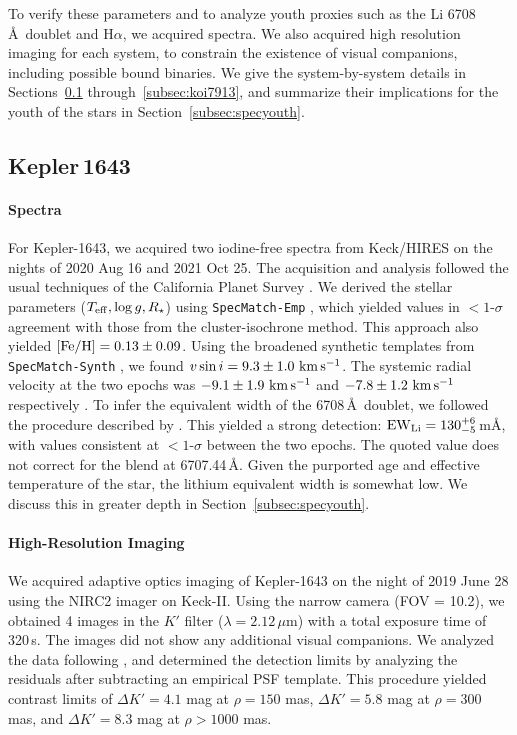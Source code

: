 \documentclass[12pt,twocolumn,tighten,linenumbers,trackchanges]{aastex63}
\newcommand{\mkms}{{\rm \,km\,s^{-1}}}  %
\begin{document}
To verify these parameters and to analyze youth
proxies such as the Li 6708\,\AA\ doublet and H$\alpha$, we acquired
spectra.  We also acquired high resolution imaging for each system, to
constrain the existence of visual companions, including possible bound
binaries.  We give the system-by-system details in Sections~\ref{subsec:kep1643}
through~\ref{subsec:koi7913}, and summarize their implications for
the youth of the stars in Section~\ref{subsec:specyouth}.

\subsection{Kepler\,1643}
\label{subsec:kep1643}

\paragraph{Spectra}
For Kepler-1643, we acquired two iodine-free spectra from Keck/HIRES
on the nights of 2020 Aug 16 and 2021 Oct 25.  The acquisition and
analysis followed the usual techniques of the California Planet Survey
\citep{howard_cps_2010}.  We derived the stellar parameters ($T_{\rm
eff}, \log g, R_\star$) using \texttt{SpecMatch-Emp}
\citep{yee_SM_2017}, which yielded values in $<$$1$-$\sigma$ agreement
with those from the cluster-isochrone method.  This approach also
yielded $[{\rm Fe/H}]=0.13 \pm 0.09$.  Using the broadened synthetic
templates from \texttt{SpecMatch-Synth} \citep{petigura_cksi_2017}, we
found $v\sin i = 9.3 \pm 1.0\,\mkms$.  The systemic radial velocity at
the two epochs was $-9.1 \pm 1.9\,\mkms$ and $-7.8\pm 1.2\,\mkms$
respectively \citep{chubak_2012}.  To infer the equivalent width of
the  6708\,\AA\ doublet, we followed the procedure
described by \citet{bouma_2021_ngc2516}.  This yielded a strong
detection: ${\rm EW}_{\rm Li} = 130^{+6}_{-5}$\,m\AA, with values
consistent at $<$$1$-$\sigma$ between the two epochs.   The quoted
value does not correct for the  blend at 6707.44\,\AA.  Given the purported age and
effective temperature of the star, the lithium equivalent width is
somewhat low.  We discuss this in greater depth in
Section~\ref{subsec:specyouth}.

\paragraph{High-Resolution Imaging}
We acquired adaptive optics imaging of Kepler-1643 on the night of
2019 June 28 using the NIRC2 imager on Keck-II.  Using the narrow
camera (FOV = 10.2\arcsec), we obtained 4 images in the $K'$ filter
($\lambda = 2.12\,\mu$m) with a total exposure time of 320\,s. 
The images did not show any additional visual companions.
We analyzed the data following \citet{kraus_impact_2016}, and
determined the detection limits by analyzing the residuals after
subtracting an empirical PSF template.  This procedure yielded
contrast limits of $\Delta K' = 4.1$ mag at $\rho = 150$ mas, $\Delta
K' = 5.8$ mag at $\rho = 300$ mas, and $\Delta K' = 8.3$ mag
at $\rho > 1000$ mas.
\end{document}
